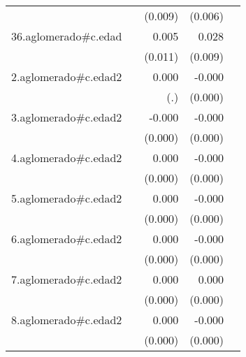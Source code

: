 {\begin{longtable}{l*{4}{D{.}{.}{-1}}}
            &                     &     (0.009)         &     (0.006)         &                     \\
\addlinespace
36.aglomerado#c.edad&                     &       0.005         &       0.028\sym{**} &                     \\
            &                     &     (0.011)         &     (0.009)         &                     \\
\addlinespace
2.aglomerado#c.edad2&                     &       0.000         &      -0.000\sym{**} &                     \\
            &                     &         (.)         &     (0.000)         &                     \\
\addlinespace
3.aglomerado#c.edad2&                     &      -0.000         &      -0.000\sym{***}&                     \\
            &                     &     (0.000)         &     (0.000)         &                     \\
\addlinespace
4.aglomerado#c.edad2&                     &       0.000         &      -0.000\sym{*}  &                     \\
            &                     &     (0.000)         &     (0.000)         &                     \\
\addlinespace
5.aglomerado#c.edad2&                     &       0.000         &      -0.000         &                     \\
            &                     &     (0.000)         &     (0.000)         &                     \\
\addlinespace
6.aglomerado#c.edad2&                     &       0.000         &      -0.000         &                     \\
            &                     &     (0.000)         &     (0.000)         &                     \\
\addlinespace
7.aglomerado#c.edad2&                     &       0.000\sym{*}  &       0.000\sym{*}  &                     \\
            &                     &     (0.000)         &     (0.000)         &                     \\
\addlinespace
8.aglomerado#c.edad2&                     &       0.000         &      -0.000         &                     \\
            &                     &     (0.000)         &     (0.000)         &                     \\

\end{longtable}}
